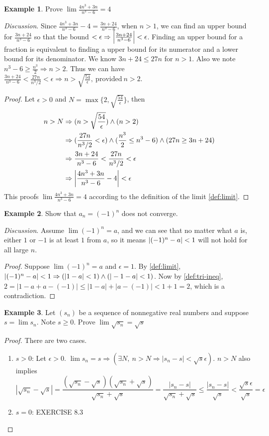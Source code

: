 \documentclass[12pt, lettersize]{book}
\theoremstyle{plain}
\theoremstyle{definition}
\newtheorem*{eg}{Example}
\theoremstyle{remark}
\begin{document}
		\begin{eg}
			Prove $\lim\frac{4n^3+3n}{n^3-6}=4$
		\end{eg}
		\emph{Discussion}. Since $\frac{4n^3+3n}{n^3-6}-4 = \frac{3n+24}{n^3-6}$, when $n>1$, we can find an upper bound for
		$\frac{3n+24}{n^3-6}$ so that the bound $<\epsilon \Rightarrow \abs{\frac{3n+24}{n^3-6}}<\epsilon$. Finding an upper bound for a fraction is equivalent to finding a upper bound for its numerator and a lower bound for its denominator.
		We know $3n+24\leq27n$ for $n>1$. Also we note $n^3-6\geq\frac{n^3}{2} \Rightarrow n>2$. Thus we can have $\frac{3n+24}{n^3-6}<\frac{27n}{n^3/2}<\epsilon \Rightarrow n>\sqrt{\frac{54}{\epsilon}},\ \text{provided}\ n>2$.
		\begin{proof}
			Let $\epsilon>0$ and $N=\max\{2,\sqrt{\frac{54}{\epsilon}}\}$, then
		\begin{align*}
			n>N &\Rightarrow (n>\sqrt{\frac{54}{\epsilon}})\land(n>2)\\
			&\Rightarrow (\frac{27n}{n^3/2}<\epsilon)\land(\frac{n^3}{2}\leq n^3-6)\land(27n\geq3n+24)\\
			&\Rightarrow \frac{3n+24}{n^3-6} < \frac{27n}{n^3/2} < \epsilon\\
			&\Rightarrow \abs{\frac{4n^3+3n}{n^3-6}-4} < \epsilon
		\end{align*}
		This proofs $\lim\frac{4n^3+3n}{n^3-6}=4$ according to the definition of the limit \ref{def:limit}.
		\end{proof}
		
		\begin{eg}
		Show that $a_n=(-1)^n$ does not converge.
		\end{eg}
		\emph{Discussion}. Assume $\lim(-1)^n=a$, and we can see that no matter what $a$ is, either $1$ or $-1$ is at least
		$1$ from $a$, so it means $\abs{(-1)^n-a}<1$ will not hold for all large $n$.
		\begin{proof}
		Suppose $\lim(-1)^n=a$ and $\epsilon = 1$. By \ref{def:limit}, $\abs{(-1)^n-a}<1 \Rightarrow (|1-a|<1)\land(|-1-a|<1)$.
		Now by \ref{def:tri-ineq}, $2=|1-a+a-(-1)|\leq|1-a|+|a-(-1)|<1+1=2$, which is a contradiction. 
		\end{proof}
		
		\begin{eg}
		Let $(s_n)$ be a sequence of nonnegative real numbers and suppose $s=\lim s_n$. Note $s\geq0$. Prove $\lim\sqrt{s_n}=\sqrt{s}$
		\end{eg}
		\begin{proof}
		There are two cases.
		\begin{enumerate}
			\item $s>0$: Let $\epsilon>0$. $\lim s_n=s \Rightarrow (\exists N,\ n>N \Rightarrow |s_n-s|<\sqrt{s}\epsilon)$.
			$n>N$ also implies
			\begin{displaymath}
				|\sqrt{s_n}-\sqrt{s}|=\frac{(\sqrt{s_n}-\sqrt{s})(\sqrt{s_n}+\sqrt{s})}{\sqrt{s_n}+\sqrt{s}}=\frac{|s_n-s|}{\sqrt{s_n}+\sqrt{s}}\leq\frac{|s_n-s|}{\sqrt{s}}<\frac{\sqrt{s}\epsilon}{\sqrt{s}}=\epsilon
			\end{displaymath}
			\item $s=0$: EXERCISE 8.3 
		\end{enumerate}
		\end{proof}
	
\end{document}
